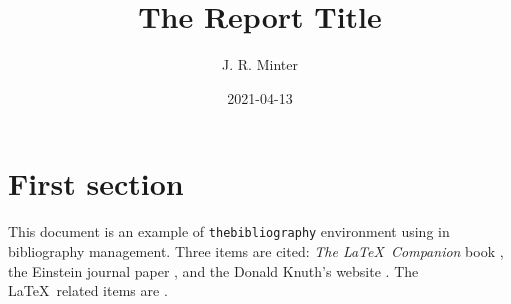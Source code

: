\documentclass[12pt]{article}
\title{The Report Title}
\author{J. R. Minter}
\date{2021-04-13}
\begin{document}
\maketitle
\nocite{*}

\section{First section}

This document is an example of \texttt{thebibliography} environment using 
in bibliography management. Three items are cited: \textit{The \LaTeX\ Companion} 
book \cite{latexcompanion}, the Einstein journal paper \cite{einstein}, and the 
Donald Knuth's website \cite{knuthwebsite}. The \LaTeX\ related items are
\cite{latexcompanion,knuthwebsite}. 

\medskip

\raggedright

\end{document}
